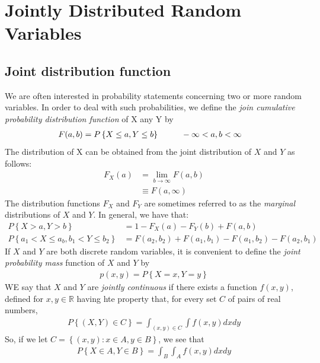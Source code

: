 \documentclass[a4paper]{article}
\begin{document}
\section{Jointly Distributed Random Variables} %
\label{sec:Jointly Distributed Random Variables}
\subsection{Joint distribution function} %
\label{sub:Joint distribution function}
We are often interested in probability statements concerning two or more random variables. In order to deal with such probabilities, we define the \emph{ join cumulative probability distribution function} of X any Y by
\begin{align}
  F(a,b) = P\left\{ X \leq a, Y \leq b \right\} & \hspace{1 cm} -\infty < a,b < \infty
\end{align}
The distribution of X can be obtained from the joint distribution of $X$ and $Y$ as follows:
\begin{align}
  F_X(a) & = \lim_{b \rightarrow \infty} F(a,b) \\
 & \equiv F(a,\infty)
\end{align}
The distribution functions $F_X$ and $F_Y$ are sometimes referred to as the \emph{marginal} distributions of $X$ and $Y$. In general, we have that:
\begin{align}
  P\left\{ X > a, Y > b \right\} & = 1- F_X(a) - F_Y(b)+ F(a,b) \\
  P\left\{ a_1 < X \leq a_b, b_1 < Y \leq b_2 \right\} & = F(a_2,b_2)+F(a_1,b_1)-F(a_1,b_2)-F(a_2,b_1)
\end{align}
If $X$ and $Y$ are both discrete random variables, it is convenient to define the \emph{joint probability mass} function of $X$ and $Y$ by
\begin{align}
  p(x,y) = P\left\{ X=x, Y=y \right\}
\end{align}
WE say that $X$ and $Y$ are \emph{jointly continuous} if there exists a function $f(x,y)$, defined for $x,y\in \mathbb{R}$ having hte property that, for every set $C$ of pairs of real numbers,
\begin{align}
  P\left\{ (X,Y)\in C \right\} = \int_{(x,y)\in C}\int f(x,y) dx dy
\end{align}
So, if we let $C=\left\{ (x,y): x \in A, y \in B \right\}$, we see that
\begin{align}
  P\left\{ X \in A, Y \in B \right\} = \int_{B}\int_A f(x,y) dx dy
\end{align}
\end{document}
